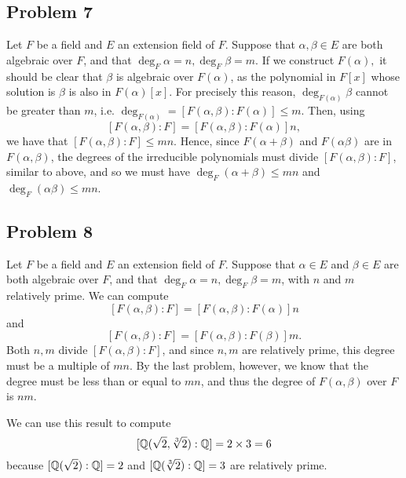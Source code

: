 \documentclass{../../mathnotes}
\begin{document}
\subsection*{Problem 7}

Let $F$ be a field and $E$ an extension field of $F$. Suppose that $\alpha,\beta\in E$ are both algebraic over $F$,
and that $\deg_F\alpha=n,\deg_F\beta=m$. If we construct $F(\alpha),$ it should be clear that $\beta$ is algebraic
over $F(\alpha)$, as the polynomial in $F[x]$ whose solution is $\beta$ is also in $F(\alpha)[x]$. For precisely
this reason, $\deg_{F(\alpha)}\beta$ cannot be greater than $m$, i.e. $\deg_{F(\alpha)}=[F(\alpha,\beta):F(\alpha)]\leq m$. Then, using
\[ [F(\alpha,\beta):F]=[F(\alpha,\beta):F(\alpha)]n,\]
we have that $[F(\alpha,\beta):F]\leq mn$. Hence, since $F(\alpha+\beta)$ and $F(\alpha\beta)$ are in $F(\alpha,\beta)$,
the degrees of the irreducible polynomials must divide $[F(\alpha,\beta):F]$, similar to above,
and so we must have $\deg_F(\alpha+\beta)\leq mn$ and $\deg_F(\alpha\beta)\leq mn$.


\subsection*{Problem 8}

Let $F$ be a field and $E$ an extension field of $F$. Suppose that $\alpha\in E$ and $\beta\in E$ are both algebraic over
$F$, and that $\deg_F\alpha=n,\deg_F\beta=m$, with $n$ and $m$ relatively prime. We can compute
\[ [F(\alpha,\beta):F]=[F(\alpha,\beta):F(\alpha)]n \]
and
\[ [F(\alpha,\beta):F]=[F(\alpha,\beta):F(\beta)]m. \]
Both $n,m$ divide $[F(\alpha,\beta):F]$, and since $n,m$ are relatively prime, this degree must be a multiple of $mn$.
By the last problem, however, we know that the degree must be less than or equal to $mn$, and thus the degree of $F(\alpha,\beta)$
over $F$ is $nm$.

We can use this result to compute 
\[ [\mathbb{Q}(\sqrt{2},\sqrt[3]{2}):\mathbb{Q}]=2\times3=6\]
because $[\mathbb{Q}(\sqrt{2}):\mathbb{Q}]=2$ and $[\mathbb{Q}(\sqrt[3]{2}):\mathbb{Q}]=3$ are relatively prime.
\end{document}
